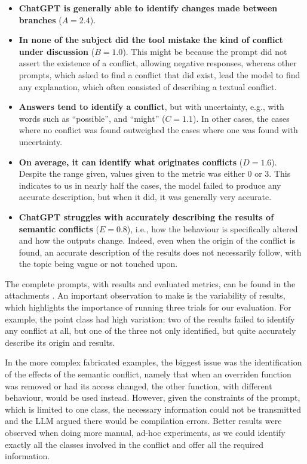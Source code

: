 \begin{itemize}
  \item \textbf{ChatGPT is generally able to identify changes made between branches} ($A=2.4$).

  \item \textbf{In none of the subject did the tool mistake the kind of conflict under discussion} ($B=1.0$). This might be because the prompt did not assert the existence of a conflict, allowing negative responses, whereas other prompts, which asked to find a conflict that did exist, lead the model to find any explanation, which often consisted of describing a textual conflict.

  \item \textbf{Answers tend to identify a conflict}, but with uncertainty, e.g., with words such as ``possible'', and ``might'' ($C=1.1$). In other cases, the cases where no conflict was found outweighed the cases where one was found with uncertainty.

  \item \textbf{On average, it can identify what originates conflicts} ($D=1.6$).  Despite the range given, values given to the metric was either 0 or 3. This indicates to us in nearly half the cases, the model failed to produce any accurate description, but when it did, it was generally very accurate.

  \item \textbf{ChatGPT struggles with accurately describing the results of semantic conflicts} ($E=0.8$), i.e., how the behaviour is specifically altered and how the outputs change. Indeed, even when the origin of the conflict is found, an accurate description of the results does not necessarily follow, with the topic being vague or not touched upon.
\end{itemize}

The complete prompts, with results and evaluated metrics, can be found in the attachments .
An important observation to make is the variability of results, which highlights the importance of running three trials for our evaluation.
For example, the point class had high variation: two of the results failed to identify any conflict at all, but one of the three not only identified, but quite accurately describe its origin and results.

In the more complex fabricated examples, the biggest issue was the identification of the effects of the semantic conflict, namely that when an overriden function was removed or had its access changed, the other function, with different behaviour, would be used instead. However, given the constraints of the prompt, which is limited to one class, the necessary information could not be transmitted and the LLM argued there would be compilation errors. 
Better results were observed when doing more manual, ad-hoc experiments, as we could identify exactly all the classes involved in the conflict and offer all the required information.

